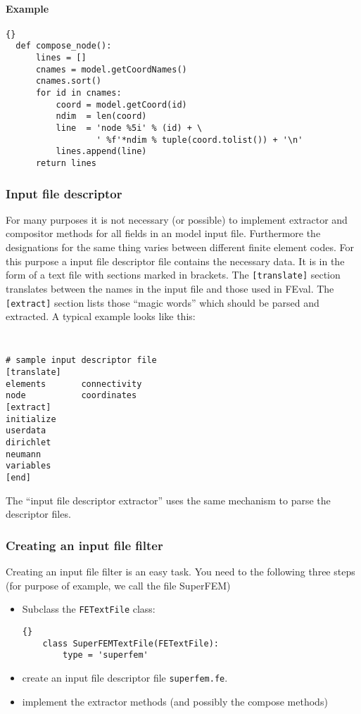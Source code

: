 \paragraph{Example}
\label{sec:example-data-compostion}

\lstset{language=Python,basicstyle=\small}
\begin{lstlisting}{}
  def compose_node():
      lines = []
      cnames = model.getCoordNames()
      cnames.sort()
      for id in cnames:
          coord = model.getCoord(id)
          ndim  = len(coord)
          line  = 'node %5i' % (id) + \
                  ' %f'*ndim % tuple(coord.tolist()) + '\n'
          lines.append(line)
      return lines
\end{lstlisting}


\subsubsection{Input file descriptor}
\label{sec:input-file-descr}

For many purposes it is not necessary (or possible) to implement extractor and
compositor methods for all fields in an model input file. Furthermore the
designations for the same thing varies between different finite element codes.
For this purpose a input file descriptor file contains the necessary data. It
is in the form of a text file with sections marked in brackets. The
\texttt{[translate]} section translates between the names in the input file
and those used in FEval. The \texttt{[extract]} section lists those ``magic
words'' which should be parsed and extracted. A typical example looks like
this:
%
{\small\tt
\begin{verbatim}
# sample input descriptor file
[translate]
elements       connectivity
node           coordinates
[extract]
initialize
userdata
dirichlet
neumann
variables
[end]
\end{verbatim}
}

The ``input file descriptor extractor'' uses the same mechanism to parse the
descriptor files.

\subsubsection{Creating an input file filter}
\label{sec:creating-input-filter}

Creating an input file filter is an easy task. You need to the following three
steps (for purpose of example, we call the file SuperFEM)

\begin{itemize}
\item Subclass the \texttt{FETextFile} class:\\
  \lstset{language=Python,basicstyle=\small}
  \begin{lstlisting}{}
    class SuperFEMTextFile(FETextFile):
        type = 'superfem'
  \end{lstlisting}
\item create an input file descriptor file \texttt{superfem.fe}.
\item implement the extractor methods (and possibly the compose methods)
\end{itemize}

